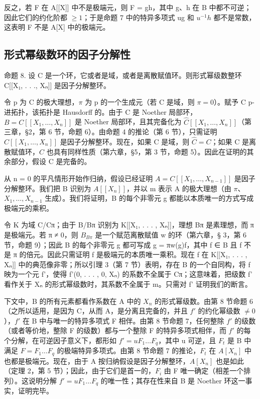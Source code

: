 反之，若 F 在 A{[}{[}X{]}{]} 中不是极端元，则 F = gh，其中 g、h 在 B 中都不可逆；因此它们的约化阶都 \(\geqslant 1\)；于是命题 7 中的特异多项式 ug 和 \(u^{-1}h\) 都不是常数，这表明 F 不是 A{[}X{]} 中的极端元。

\subsection{形式幂级数环的因子分解性}

命题 8. 设 C 是一个环，它或者是域，或者是离散赋值环。则形式幂级数整环 C{[}{[}X₁, . . ., Xₙ{]}{]} 是因子分解整环。

令 p 为 C 的极大理想，\(\pi\) 为 p 的一个生成元（若 C 是域，则 \(\pi = 0\)）。赋予 C p-进拓扑，该拓扑是 Hausdorff 的。由于 C 是 Noether 局部环，\(B = C[[X_{1}, \ldots, X_{n}]]\) 是 Noether 局部环，且其完备化为 \(\hat{C}[[X_{1}, \ldots, X_{n}]]\)（第三章，§2，第 6 节，命题 6）。由命题 4 的推论（第 6 节），只需证明 \(\hat{C}[[X_{1}, \ldots, X_{n}]]\) 是因子分解整环。现在，如果 C 是域，则 \(\hat{C} = C\)；如果 C 是离散赋值环，\(\hat{C}\) 也具有同样性质（第六章，§5，第 3 节，命题 5）。因此在证明的其余部分，假设 C 是完备的。

从 n = 0 的平凡情形开始作归纳，假设已经证明 \(A = C[[X_{1}, \ldots, X_{n-1}]]\) 是因子分解整环。我们把 B 识别为 \(A[[X_{n}]]\)，并以 m 表示 A 的极大理想（由 \(\pi\)、\(X_{1}, \ldots, X_{n-1}\) 生成）。我们将证明，B 的每个非零元 g 都能以本质唯一的方式写成极端元的乘积。

令 K 为域 C/Cπ；由于 B/Bπ 识别为 K{[}{[}X₁, . . . , Xₙ{]}{]}，理想 Bπ 是素理想，而 π 是极端元。若 π ≠ 0，则 \(B_{B\pi}\) 是一个赋范离散赋值 w 的环（第六章，§ 3，第 6 节，命题 9）；因此 B 的每个非零元 g 都可写成 g = πw(g)f，其中 f ∈ B 且 f 不是 π 的倍元。因此只需证明 f 是极端元的本质唯一乘积。现在 f 在 K{[}{[}X₁, . . . , Xₙ{]}{]} 中的典范像非零；所以引理 3（第 7 节）表明，存在 B 的一个自同构，将 f 映为一个元 f'，使得 f'(0, . . . , 0, Xₙ) 的系数不全属于 Cπ；这意味着，把级数 f' 看作关于 Xₙ 的形式幂级数时，其系数不全属于 m。只需对 f' 证明我们的断言。

下文中，B 的所有元素都看作系数在 A 中的 \(X_{n}\) 的形式幂级数。由第 8 节命题 6（之所以适用，是因为 C，从而 A，是分离且完备的，并且 \(f'\) 的约化幂级数 \(\neq0\)），\(f'\) 在 B 中与唯一的特异多项式 F 相伴。由第 8 节命题 7，任何整除 \(f'\) 的级数（或者等价地，整除 F 的级数）都与一个整除 F 的特异多项式相伴，而 \(f'\) 的每个分解，在可逆因子意义下，都形如 \(f' = uF_{1}\ldots F_{q}\)，其中 u 可逆，且 \(F_{t}\) 是 B 中满足 \(F = F_{1}\ldots F_{q}\) 的极端特异多项式。由第 8 节命题 7 的推论，\(F_{t}\) 在 \(A[X_{n}]\) 中也都是极端元。现在，由于 A 按归纳假设是因子分解整环，\(A[X_{n}]\) 也是如此（定理 2，第 5 节）；因此，由于它们是首一的，\(F_{i}\) 由 F 唯一确定（相差一个排列）。这说明分解 \(f' = uF_{1} \ldots F_{q}\) 的唯一性；其存在性来自 B 是 Noether 环这一事实，证明完毕。

